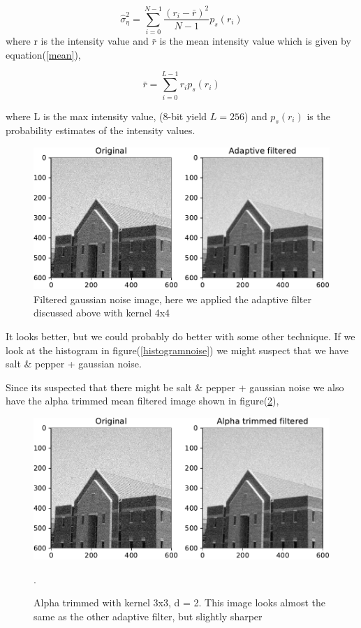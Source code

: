 {\begin{equation}
    \hat{\sigma}^{2}_{\eta} = \sum_{i = 0}^{N-1}\frac{(r_{i} - \bar{r})^{2}}{N-1}p_{s}(r_{i})
    \label{variance}
\end{equation}
where r is the intensity value and $\bar{r}$ is the mean intensity value which is given by equation(\ref{mean}),

\begin{equation}
    \bar{r} = \sum_{i=0}^{L-1}r_{i}p_{s}(r_{i})
    \label{mean}
\end{equation}

where L is the max intensity value, (8-bit yield $L = 256$) and $p_{s}(r_{i})$ is the probability estimates of the intensity values.

\begin{figure}[!htb]
    {\centering
        \includegraphics[width=1\textwidth]{gaussianfiltered.pdf}
        \caption{Filtered gaussian noise image, here we applied the adaptive filter discussed above with kernel 4x4 }
        \label{adaptivefig}
    \par}
    \end{figure}

It looks better, but we could probably do better with some other technique. If we look at the histogram in figure(\ref{histogramnoise}) we might suspect that we have salt \& pepper + gaussian noise.

Since its suspected that there might be salt \& pepper + gaussian noise we also have the alpha trimmed mean filtered image shown in figure(\ref{alphatrimmed}),

\begin{figure}[!htb]
    {\centering
        \includegraphics[width=1\textwidth]{alphatrimmed.pdf}
        \caption{Alpha trimmed with kernel 3x3, d = 2. This image looks almost the same as the other adaptive filter, but slightly sharper}.
        \label{alphatrimmed}
    \par}
    \end{figure}

}
